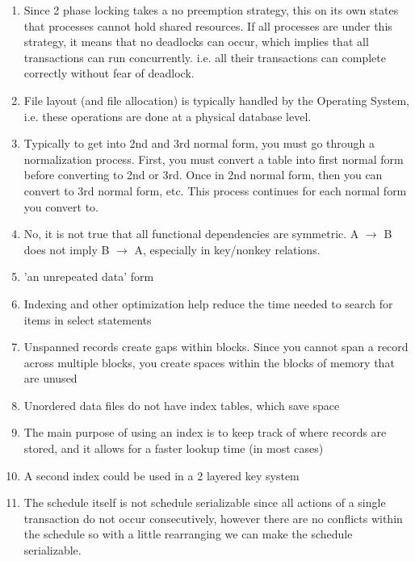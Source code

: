 \documentclass[12pt]{article}
\begin{document}
\begin{enumerate}
	\item Since 2 phase locking takes a no preemption strategy, this on its own states that processes cannot hold shared resources. If all processes are under this strategy,
it means that no deadlocks can occur, which implies that all transactions can run concurrently. i.e. all their transactions can complete correctly without fear of deadlock.
	
	\item File layout (and file allocation) is typically handled by the Operating System, i.e. these operations are done at a physical database level.
	
	\item Typically to get into 2nd and 3rd normal form, you must go through a normalization process. First, you must convert a table into first normal
form before converting to 2nd or 3rd. Once in 2nd normal form, then you can convert to 3rd normal form, etc. This process continues for each normal
form you convert to.
	
	\item No, it is not true that all functional dependencies are symmetric.  A $\rightarrow$ B does not imply B $\rightarrow$ A, especially in key/nonkey relations.
	
	\item 'an unrepeated data' form
	
	\item Indexing and other optimization help reduce the time needed to search for items in select statements
	
	\item Unspanned records create gaps within blocks. Since you cannot span a record across multiple blocks, you create spaces within the blocks of memory that are unused
	
	\item Unordered data files do not have index tables, which save space
	
	\item The main purpose of using an index is to keep track of where records are stored, and it allows for a faster lookup time (in most cases)
	
	\item A second index could be used in a 2 layered key system
	
	\item  The schedule itself is not schedule serializable since all actions of a single transaction do not occur consecutively, however there are no conflicts within the
 schedule so with a little rearranging we can make the schedule serializable.


\end{enumerate}
\end{document}
